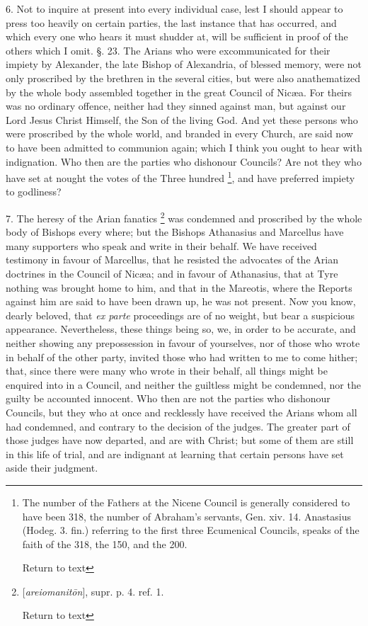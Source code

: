 6. Not to inquire at present into every
individual case, lest I should appear to press too heavily on
certain parties, the last instance that has occurred, and which every
one who hears it must shudder at, will be sufficient in proof of the
others which I omit. §. 23. The Arians who were excommunicated for
their impiety by Alexander, the late Bishop of Alexandria, of blessed
memory, were not only proscribed by the brethren in the several
cities, but were also anathematized by the whole body assembled
together in the great Council of Nicæa. For theirs was no ordinary
offence, neither had they sinned against man, but against our Lord
Jesus Christ Himself, the Son of the living God. And yet these persons
who were proscribed by the whole world, and branded in every Church,
are said now to have been admitted to communion again; which I think
you ought to hear with indignation. Who then are the parties who
dishonour Councils? Are not they who have set at nought the votes of
the Three hundred \footnote{The number of the Fathers at the Nicene Council is generally
considered to have been 318, the number of Abraham's servants, Gen.
xiv. 14. Anastasius (Hodeg. 3. fin.) referring to the first three
Ecumenical Councils, speaks of the faith of the 318, the 150, and the
200.

Return to text}, and
have preferred impiety to godliness?

7. The heresy of the Arian fanatics \footnote{[\emph{areiomanit\={o}n}], supr. p. 4. ref. 1.

Return to text} was condemned and proscribed by the whole body of Bishops
every where; but the Bishops Athanasius and Marcellus have many
supporters who speak and write in their behalf. We have received
testimony in favour of Marcellus, that he resisted the advocates of
the Arian doctrines in the Council of Nicæa; and in favour of
Athanasius, that at Tyre nothing was brought home to him, and that in
the Mareotis, where the Reports against him are said to have been
drawn up, he was not present. Now you know, dearly beloved, that \emph{ex
parte} proceedings are of no weight, but bear a suspicious
appearance. Nevertheless, these things being so, we, in order to be
accurate, and neither showing any prepossession in favour of
yourselves, nor of those who wrote in behalf of the other party,
invited those who had written to me to come hither; that, since there
were many who wrote in their behalf, all things might be enquired into
in a Council, and neither the guiltless might be condemned, nor the
guilty be accounted innocent. Who then are not the parties who
dishonour Councils, but they who at once and recklessly have received
the Arians whom all had condemned, and contrary to the decision
of the judges. The greater part of those judges have now departed, and
are with Christ; but some of them are still in this life of trial, and
are indignant at learning that certain persons have set aside their
judgment.

